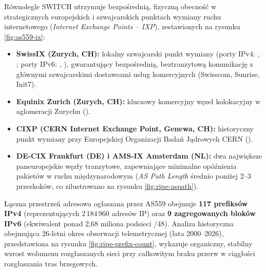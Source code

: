 Równolegle SWITCH utrzymuje bezpośrednią, fizyczną obecność w strategicznych europejskich i szwajcarskich punktach wymiany ruchu internetowego (\textit{Internet Exchange Points -- IXP}), zestawionych na rysunku \ref{fig:as559-ix}:
\begin{itemize}
    \item \textbf{SwissIX (Zurych, CH):} lokalny szwajcarski punkt wymiany (porty IPv4: , ; porty IPv6: , ), gwarantujący bezpośrednią, beztranzytową komunikację z głównymi szwajcarskimi dostawcami usług komercyjnych (Swisscom, Sunrise, Init7).
    \item \textbf{Equinix Zurich (Zurych, CH):} kluczowy komercyjny węzeł kolokacyjny w aglomeracji Zurychu ().
    \item \textbf{CIXP (CERN Internet Exchange Point, Genewa, CH):} historyczny punkt wymiany przy Europejskiej Organizacji Badań Jądrowych CERN ().
    \item \textbf{DE-CIX Frankfurt (DE) i AMS-IX Amsterdam (NL):} dwa największe paneuropejskie węzły tranzytowe, zapewniające minimalne opóźnienia pakietów w ruchu międzynarodowym (\textit{AS Path Length} średnio poniżej 2--3 przeskoków, co zilustrowano na rysunku \ref{fig:ripe-aspath}).
\end{itemize}




Łączna przestrzeń adresowa ogłaszana przez AS559 obejmuje \textbf{117 prefiksów IPv4} (reprezentujących 2\,184\,960 adresów IP) oraz \textbf{9 zagregowanych bloków IPv6} (ekwiwalent ponad 2{,}68 miliona podsieci /48). Analiza historyczna obejmująca 26-letni okres obserwacji telemetrycznej (lata 2000--2026), przedstawiona na rysunku \ref{fig:ripe-prefix-count}, wykazuje organiczny, stabilny wzrost wolumenu rozgłaszanych sieci przy całkowitym braku przerw w ciągłości rozgłaszania tras brzegowych.



